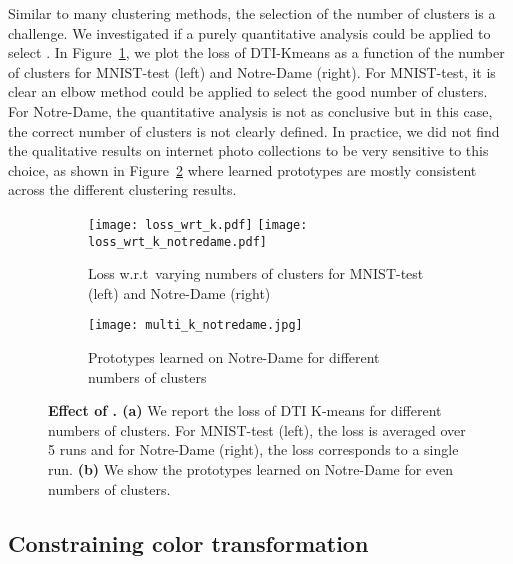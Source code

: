 \documentclass{article}
\begin{document}
Similar to many clustering methods, the selection of the number of clusters is a challenge.  
We investigated if a purely quantitative analysis could be applied to select . In 
Figure~\ref{fig:loss_k_quant}, we plot the loss of DTI-Kmeans as a function of the number of 
clusters for MNIST-test (left) and Notre-Dame (right). For MNIST-test, it is clear an elbow 
method could be applied to select the good number of clusters. For Notre-Dame, the 
quantitative analysis is not as conclusive but in this case, the correct number of clusters 
is not clearly defined. In practice, we did not find the qualitative results on internet 
photo collections to be very sensitive to this choice, as shown in 
Figure~\ref{fig:loss_k_qual} where learned prototypes are mostly consistent across the 
different clustering results.
\begin{figure}[!h]
  \centering
  \begin{subfigure}{\columnwidth}
    \centering
    \texttt{[image: loss\_wrt\_k.pdf]}\quad
    \texttt{[image: loss\_wrt\_k\_notredame.pdf]}
    \caption{Loss w.r.t\ varying numbers of clusters for MNIST-test (left) and Notre-Dame 
    (right)}
    \label{fig:loss_k_quant}
  \end{subfigure}
  \begin{subfigure}{\columnwidth}
    \centering
    \vspace{0.1em}
    \texttt{[image: multi\_k\_notredame.jpg]}
    \caption{Prototypes learned on Notre-Dame for different numbers of clusters}
    \label{fig:loss_k_qual}
  \end{subfigure}

  \caption{\textbf{Effect of . (a)} We report the loss of DTI K-means for different 
  numbers of clusters. For MNIST-test (left), the loss is averaged over 5 runs and for 
Notre-Dame (right), the loss corresponds to a single run. \textbf{(b)} We show the prototypes 
learned on Notre-Dame for even numbers of clusters.}
  \label{fig:loss_wrt_k}
\end{figure}

\subsection{Constraining color transformation}\label{sec:color_discuss}
\end{document}
